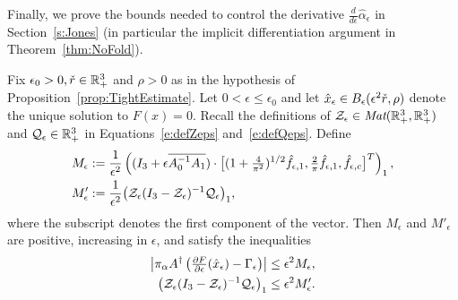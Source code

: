 Finally, we prove the bounds needed to control the derivative $\frac{d}{d\epsilon} \hat{\alpha}_\epsilon$ in Section~\ref{s:Jones}
(in particular the implicit differentiation argument in Theorem~\ref{thm:NoFold}).



\begin{lemma}
		\label{lem:Meps}
		Fix $ \epsilon_0 > 0 , \check{r} \in \mathbb{R}^3_+ $ and $\rho >0$ as in the hypothesis of Proposition~\ref{prop:TightEstimate}. 
Let $ 0 < \epsilon \leq \epsilon_0$ and let $ \hat{x}_\epsilon \in B_\epsilon(\epsilon^2  \check{r},\rho)$ denote the unique solution to $F(x) = 0$. 
Recall the definitions of  
$\mathcal{Z}_\epsilon \in  \emph{Mat}(\mathbb{R}_+^3 , \mathbb{R}_+^3)$
and $\mathcal{Q}_\epsilon \in  \mathbb{R}_+^3$ in Equations~\eqref{e:defZeps} and~\eqref{e:defQeps}.  
Define 
		\begin{alignat*}{1}
		M_\epsilon &:= \frac{1}{\epsilon^2} \left(	(I_3+\epsilon \overline{A_0^{-1} A_1} ) \cdot  \bigl[(1+\tfrac{4}{\pi^2})^{1/2}\hat{f}_{\epsilon,1},\tfrac{2}{\pi} \hat{f}_{\epsilon,1}, \hat{f}_{\epsilon,c} \bigr]^{T} \right)_1  ,\\
		M'_\epsilon  &:=  \frac{1}{ \epsilon^2 } \bigl( \mathcal{Z}_\epsilon (I_3-\mathcal{Z}_\epsilon)^{-1} \mathcal{Q}_\epsilon \bigr)_1  ,
		\end{alignat*}
where the subscript denotes the first component of the vector.
Then $M_\epsilon$ and $M'_\epsilon$ are positive, increasing in $\epsilon$, and satisfy the inequalities
 \begin{alignat}{1}
 \left| \pi_\alpha A^{\dagger} \left( \tfrac{\partial F}{\partial  \epsilon}(\hat{x}_\epsilon) - \Gamma_\epsilon \right)  \right|  &\leq\epsilon^2 M_\epsilon , \label{eq:Mepsilon}\\
 \left( \mathcal{Z}_\epsilon (I_3-\mathcal{Z}_\epsilon)^{-1} \mathcal{Q}_\epsilon \right)_1 &\leq \epsilon^2 M'_\epsilon . \label{eq:MMepsilon}
 \end{alignat}
\end{lemma}

